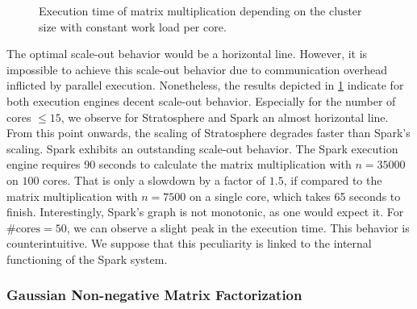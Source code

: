 \begin{figure}[!h]
	\centering
	\caption{Execution time of matrix multiplication depending on the cluster size with constant work load per core.}
	\label{fig:mmNodesRuntime}
\end{figure}

The optimal scale-out behavior would be a horizontal line.
However, it is impossible to achieve this scale-out behavior due to communication overhead inflicted by parallel execution.
Nonetheless, the results depicted in \cref{fig:mmNodesRuntime} indicate for both execution engines decent scale-out behavior.
Especially for the number of cores $\le 15$, we observe for Stratosphere and Spark an almost horizontal line.
From this point onwards, the scaling of Stratosphere degrades faster than Spark's scaling.
Spark exhibits an outstanding scale-out behavior.
The Spark execution engine requires 90 seconds to calculate the matrix multiplication with $n=35000$ on $100$ cores.
That is only a slowdown by a factor of $1.5$, if compared to the matrix multiplication with $n=7500$ on a single core, which takes 65 seconds to finish.
Interestingly, Spark's graph is not monotonic, as one would expect it.
For $\text{\#cores}=50$, we can observe a slight peak in the execution time.
This behavior is counterintuitive.
We suppose that this peculiarity is linked to the internal functioning of the Spark system.

\subsubsection{Gaussian Non-negative Matrix Factorization}
\label{subsec:NMF}

